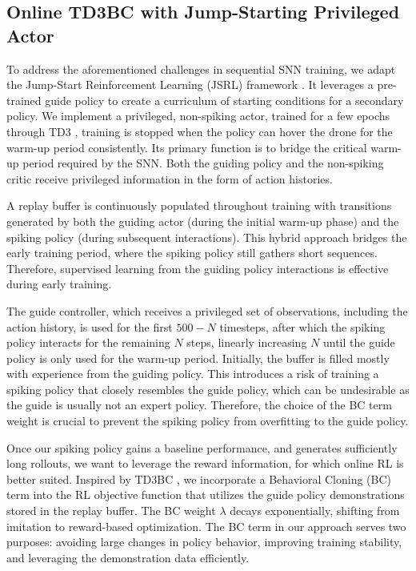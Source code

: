 \subsection{Online TD3BC with Jump-Starting Privileged Actor}\label{sub:seq_snn}
To address the aforementioned challenges in sequential SNN training, we adapt the Jump-Start Reinforcement Learning (JSRL) framework \cite{Uchendu2022}. It leverages a pre-trained guide policy to create a curriculum of starting conditions for a secondary policy. We implement a privileged, non-spiking actor, trained for a few epochs through TD3 \cite{fujimoto2018addressing}, training is stopped when the policy can hover the drone for the warm-up period consistently. Its primary function is to bridge the critical warm-up period required by the SNN. Both the guiding policy and the non-spiking critic receive privileged information in the form of action histories. 

A replay buffer is continuously populated throughout training with transitions generated by both the guiding actor (during the initial warm-up phase) and the spiking policy (during subsequent interactions). This hybrid approach bridges the early training period, where the spiking policy still gathers short sequences. Therefore, supervised learning from the guiding policy interactions is effective during early training. 

The guide controller, which receives a privileged set of observations, including the action history, is used for the first $500-N$ timesteps, after which the spiking policy interacts for the remaining $N$ steps, linearly increasing $N$ until the guide policy is only used for the warm-up period. Initially, the buffer is filled mostly with experience from the guiding policy. This introduces a risk of training a spiking policy that closely resembles the guide policy, which can be undesirable as the guide is usually not an expert policy. Therefore, the choice of the BC term weight is crucial to prevent the spiking policy from overfitting to the guide policy.

Once our spiking policy gains a baseline performance, and generates sufficiently long rollouts, we want to leverage the reward information, for which online RL is better suited. Inspired by TD3BC \cite{FujimotoMinimal}, we incorporate a Behavioral Cloning (BC) term into the RL objective function that utilizes the guide policy demonstrations stored in the replay buffer. The BC weight \(\lambda\) decays exponentially, shifting from imitation to reward-based optimization. The BC term in our approach serves two purposes: avoiding large changes in policy behavior, improving training stability, and leveraging the demonstration data efficiently. 

